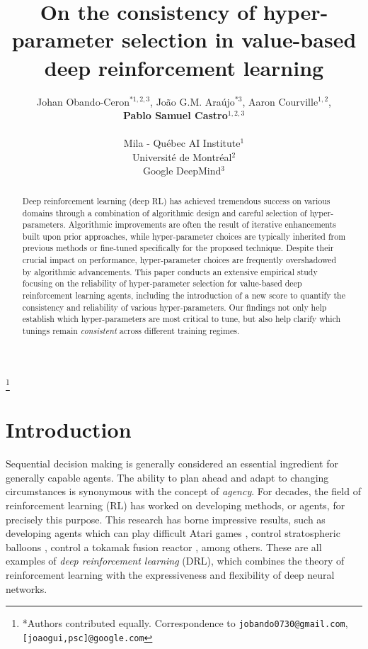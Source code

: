 \documentclass[10pt]{article} %
\title{On the consistency of hyper-parameter selection in value-based deep reinforcement learning}
\author{Johan Obando-Ceron\(^{*1,2,3}\), João G.M. Araújo\(^{*3}\), Aaron Courville\(^{1,2}\), \\\textbf{Pablo Samuel Castro\(^{1,2,3}\)
}\\\\
Mila - Québec AI Institute\(^{1}\) \\
Universit\'e de Montr\'eal\(^{2}\) \\
Google DeepMind\(^{3}\)  \\
}
\newcommand\blfootnote[1]{%
  \begingroup
  \renewcommand\thefootnote{}\footnote{#1}%
  \addtocounter{footnote}{-1}%
  \endgroup
}
\begin{document}
\maketitle
\blfootnote{*Authors contributed equally. Correspondence to \texttt{jobando0730@gmail.com},\texttt{[joaogui,psc]@google.com}}

\begin{abstract}
Deep reinforcement learning (deep RL) has achieved tremendous success on various domains through a combination of algorithmic design and careful selection of hyper-parameters. Algorithmic improvements are often the result of iterative enhancements built upon prior approaches, while hyper-parameter choices are typically inherited from previous methods or fine-tuned specifically for the proposed technique. Despite their crucial impact on performance, hyper-parameter choices are frequently overshadowed by algorithmic advancements. This paper conducts an extensive empirical study focusing on the reliability of hyper-parameter selection for value-based deep reinforcement learning agents, including the introduction of a new score to quantify the consistency and reliability of various hyper-parameters. Our findings not only help establish which hyper-parameters are most critical to tune, but also help clarify which tunings remain {\em consistent} across different training regimes.

\end{abstract}

\section{Introduction}
\label{sec:introduction}

Sequential decision making is generally considered an essential ingredient for generally capable agents. The ability to plan ahead and adapt to changing circumstances is synonymous with the concept of {\em agency}. For decades, the field of reinforcement learning (RL) has worked on developing methods, or agents, for precisely this purpose. This research has borne impressive results, such as developing agents which can play difficult Atari games \citep{mnih2015humanlevel}, control stratospheric balloons \citep{Bellemare2020AutonomousNO}, control a tokamak fusion reactor \citep{Degrave2022MagneticCO}, among others. These are all examples of {\em deep reinforcement learning} (DRL), which combines the theory of reinforcement learning with the expressiveness and flexibility of deep neural networks.
\end{document}
